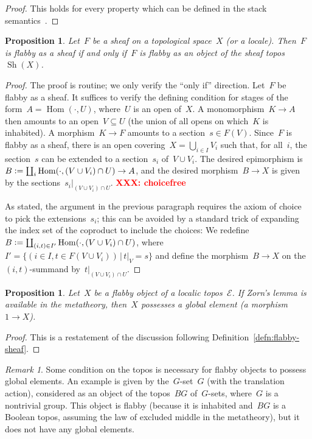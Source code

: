 \documentclass[oneside]{amsart}
\theoremstyle{definition}
\theoremstyle{plain}
\newtheorem{prop}[defn]{Proposition}
\theoremstyle{remark}
\newtheorem{rem}[defn]{Remark}
\newcommand{\XXX}[1]{\textbf{\textcolor{red}{XXX: #1}}}
\newcommand{\E}{\mathcal{E}}
\newcommand{\defeq}{\vcentcolon=}
\DeclareMathOperator{\Hom}{Hom}
\DeclareMathOperator{\Sh}{Sh}
\renewcommand{\_}{\mathpunct{.}\,}
\begin{document}
\begin{proof}This holds for every property which can be defined
in the stack semantics~\cite[Lemma~7.3]{shulman:stack-semantics}.
\end{proof}

\begin{prop}\label{prop:flabby-sheaves-objects}
Let~$F$ be a sheaf on a topological space~$X$ (or a locale).
Then~$F$ is flabby as a sheaf if and only if~$F$ is flabby as an object of the
sheaf topos~$\Sh(X)$.
\end{prop}

\begin{proof}The proof is routine; we only verify the ``only if'' direction.
Let~$F$ be flabby as a sheaf. It suffices to verify the defining condition for stages
of the form~$A = \Hom(\cdot,U)$, where~$U$ is an open of~$X$. A monomorphism~$K
\to A$ then amounts to an open~$V \subseteq U$ (the union of all opens on
which~$K$ is inhabited). A morphism~$K \to F$ amounts to a section~$s \in
F(V)$. Since~$F$ is flabby as a sheaf, there is an open covering~$X =
\bigcup_{i \in I} V_i$ such that, for all~$i$, the section~$s$ can be extended
to a section~$s_i$ of~$V \cup V_i$. The desired epimorphism is~$B \defeq
\coprod_i \Hom(\cdot,(V \cup V_i) \cap U) \to A$, and the desired morphism~$B
\to X$ is given by the sections~$s_i|_{(V \cup V_i) \cap U}$.
\XXX{choicefree}

As stated, the argument in the previous paragraph requires the axiom of choice
to pick the extensions~$s_i$; this can be avoided by a standard trick of
expanding the index set of the coproduct to include the choices: We redefine $B \defeq
\coprod_{(i,t) \in I'} \Hom(\cdot, (V \cup V_i) \cap U)$, where~$I' = \{ (i \in
I, t \in F(V \cup V_i)) \,|\, t|_V = s \}$ and define the morphism~$B \to X$ on
the~$(i,t)$-summand by~$t|_{(V \cup V_i) \cap U}$.
\end{proof}

\begin{prop}\label{prop:global-elements}
Let~$X$ be a flabby object of a localic topos~$\E$. If
Zorn's lemma is available in the metatheory, then~$X$ possesses a global element (a morphism~$1 \to X$).
\end{prop}

\begin{proof}This is a restatement of the discussion following
Definition~\ref{defn:flabby-sheaf}.
\end{proof}

\begin{rem}\label{rem:flabby-global}
Some condition on the topos is necessary for flabby objects to
possess global elements. An example is given by the~$G$-set~$G$ (with the
translation action), considered as an object of the topos~$BG$ of~$G$-sets,
where~$G$ is a nontrivial group. This object is flabby (because it is inhabited
and~$BG$ is a Boolean topos, assuming the law of excluded middle in the
metatheory), but it does not have any global elements.
\end{rem}
\end{document}

